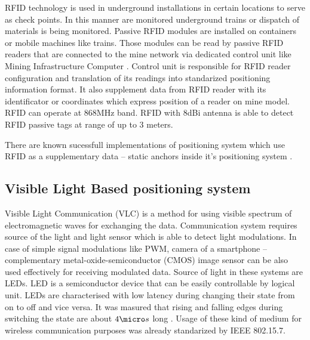 \documentclass[../main.tex]{subfiles}
\begin{document}
RFID technology is used in underground installations in certain locations to serve as check points. In this manner are monitored underground trains or dispatch of materials is being monitored. Passive RFID modules are installed on containers or mobile machines like trains. Those modules can be read by passive RFID readers that are connected to the mine network via dedicated control unit like Mining Infrastructure Computer \cite{Thesis_CM}. Control unit is responsible for RFID reader configuration and translation of its readings into standarized positioning information format. It also supplement data from RFID reader with its identificator or coordinates which express position of a reader on mine model. RFID can operate at 868MHz band. RFID with 8dBi antenna is able to detect RFID passive tags at range of up to 3 meters.

There are known sucessfull implementations of positioning system which use RFID as a supplementary data -- static anchors inside it's positioning system \cite{article_rfid_imu_safety_nav}\cite{thesis_smartphone_inertial_plus_rfid}.



\subsection{Visible Light Based positioning system} %
\label{sub:visible_light_based_positioning_system}


Visible Light Communication (VLC) is a method for using visible spectrum of electromagnetic waves for exchanging the data. Communication system requires source of the light and light sensor which is able to detect light modulations. In case of simple signal modulations like PWM, camera of a smartphone -- complementary
metal-oxide-semiconductor (CMOS) image sensor can be also used effectively for receiving modulated data. Source of light in these systems are LEDs. LED is a semiconductor device that can be easily controllable by logical unit. LEDs are characterised with low latency during changing their state from on to off and vice versa. It was masured that rising and falling edges during switching the state are about $4 \micro s$ long \cite{visible_light_positioning_epsilon}. Usage of these kind of medium for wireless communication purposes was already standarized by IEEE 802.15.7.
\end{document}
